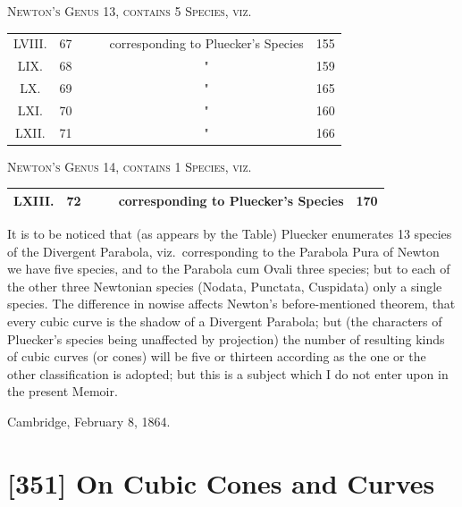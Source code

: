 \documentclass[11pt,a4paper]{article}
\theoremstyle{plain}
\begin{document}
\begin{center}
\textsc{Newton's Genus 13, contains 5 Species, viz.}
\end{center}
\begin{center}
\begin{tabular}{cccccc}
\toprule
LVIII. & 67 & & & corresponding to Pluecker's Species & 155 \\
LIX. & 68 & & & " & 159 \\
LX. & 69 & & & " & 165 \\
LXI. & 70 & & & " & 160 \\
LXII. & 71 & & & " & 166 \\
\bottomrule
\end{tabular}
\end{center}

\begin{center}
\textsc{Newton's Genus 14, contains 1 Species, viz.}
\end{center}
\begin{center}
\begin{tabular}{cccccc}
\toprule
LXIII. & 72 & & & corresponding to Pluecker's Species & 170 \\
\bottomrule
\end{tabular}
\end{center}

\vspace{6pt}
\noindent It is to be noticed that (as appears by the Table) Pluecker enumerates 13 species of the Divergent Parabola, viz.\ corresponding to the Parabola Pura of Newton we have five species, and to the Parabola cum Ovali three species; but to each of the other three Newtonian species (Nodata, Punctata, Cuspidata) only a single species. The difference in nowise affects Newton's before-mentioned theorem, that every cubic curve is the shadow of a Divergent Parabola; but (the characters of Pluecker's species being unaffected by projection) the number of resulting kinds of cubic curves (or cones) will be five or thirteen according as the one or the other classification is adopted; but this is a subject which I do not enter upon in the present Memoir.

\begin{flushright}
Cambridge, February 8, 1864.
\end{flushright}

\newpage
\section*{[351] On Cubic Cones and Curves}
\end{document}
